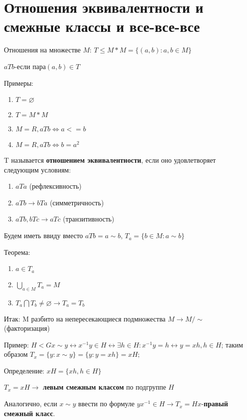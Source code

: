 \documentclass[12pt]{article}
\begin{document}
		
		\newpage
		\section{Отношения эквивалентности и смежные классы и все-все-все}
		
		Отношения на множестве $M$:
		$T \le M*M=\{(a,b):a,b\in M\}$
		
		$aTb$-если пара$(a,b)\in T$ 
		
		Примеры:
		\begin{enumerate}
			\item $T=\varnothing$
			\item $T=M*M$
			\item $M=R, aTb \Leftrightarrow a<=b$
			\item $M=R, aTb \Leftrightarrow b=a^2$
		\end{enumerate}
		
		T называется \hypertarget{indef:equiv}{\textbf{отношением эквивалентности}}, если оно удовлетворяет следующим условиям:
		\begin{enumerate}
			\item $aTa$ (рефлексивность)
			\item $aTb \rightarrow bTa$ (симметричность)
			\item $aTb, bTc \rightarrow aTc$ (транзитивность)
		\end{enumerate}
		
		Будем иметь ввиду вместо $aTb=a\sim b$, $T_a=\{b\in M:a\sim b\}$
		
		Теорема:
		\begin{enumerate}
			\item $a\in T_a$
			\item $\bigcup_{a\in M} T_a=M$
			\item $T_a \bigcap T_b \not= \varnothing \rightarrow T_a=T_b$
		\end{enumerate}
		
		
		Итак: M разбито на непересекающиеся подмножества $M\rightarrow M/\sim$ (факторизация)
		
		Пример: $H<G x\sim y \leftrightarrow x^{-1}y \in H \leftrightarrow \exists h\in H: x^{-1}y=h\leftrightarrow y=xh, h\in H$; таким образом $T_x=\{y:x\sim y\}=\{y:y=xh\}=xH;$
		
		Определение: $xH=\{xh, h\in H\}$
		
		$T_x=xH \rightarrow$ \hypertarget{indef:left_class}{\textbf{левым смежным классом}} по подгруппе $H$
		
		Аналогично, если $ x\sim y$ ввести по формуле $yx^{-1}\in H\rightarrow T_x=Hx$-\hypertarget{indef:right_class}{\textbf{правый смежный класс}}.
		
\end{document}
